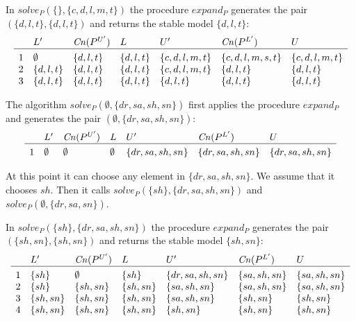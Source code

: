 \begin{Loesung}
{\begin{UList}
In $solve_P(\{\},\{c,d,l,m,t\})$ 
the procedure $expand_P$ generates the pair
$(\{d,l,t\},\{d,l,t\})$ 
and returns the stable model $\{d,l,t\}$:
\[
\begin{array}{c@{\hspace{10pt}}llllll}
& L' & \mathit{Cn}(P^{U'}) & L
& U' & \mathit{Cn}(P^{L'}) & U \\\hline\\[-3mm]
1 & \emptyset & \{d,l,t\} & \{d,l,t\} & \{c,d,l,m,t\} & \{c,d,l,m,s,t\} & \{c,d,l,m,t\} \\ 
2 & \{d,l,t\} & \{d,l,t\} & \{d,l,t\} & \{c,d,l,m,t\} & \{d,l,t\} & \{d,l,t\} \\ 
3 & \{d,l,t\} & \{d,l,t\} & \{d,l,t\} & \{d,l,t\} & \{d,l,t\} & \{d,l,t\} \\ 
\end{array}
\]

%
\item
The algorithm $solve_P(\emptyset, \{dr,sa,sh,sn\})$ 
first applies the procedure $expand_P$ and
generates the pair $(\emptyset, \{dr,sa,sh,sn\})$:
\[
\begin{array}{c@{\hspace{10pt}}llllll}
& L' & \mathit{Cn}(P^{U'}) & L
& U' & \mathit{Cn}(P^{L'}) & U \\\hline\\[-3mm]
1 & \emptyset & \emptyset & \emptyset & \{dr,sa,sh,sn\} & \{dr,sa,sh,sn\} & \{dr,sa,sh,sn\} \\ 
\end{array}
\]

At this point it can choose any element in $\{dr,sa,sh,sn\}$.
We assume that it chooses $sh$.
Then it calls $solve_P(\{sh\},\{dr,sa,sh,sn\})$ and $solve_P(\emptyset,\{dr,sa,sn\})$.

In $solve_P(\{sh\},\{dr,sa,sh,sn\})$ 
the procedure $expand_P$ generates the pair
\\
$(\{sh,sn\},\{sh,sn\})$ 
and returns the stable model $\{sh,sn\}$:
\[
\begin{array}{c@{\hspace{10pt}}llllll}
& L' & \mathit{Cn}(P^{U'}) & L
& U' & \mathit{Cn}(P^{L'}) & U \\\hline\\[-3mm]
1 & \{sh\} & \emptyset & \{sh\} & \{dr,sa,sh,sn\} & \{sa,sh,sn\} & \{sa,sh,sn\} \\ 
2 & \{sh\} & \{sh,sn\} & \{sh,sn\} & \{sa,sh,sn\} & \{sa,sh,sn\} & \{sa,sh,sn\} \\ 
3 & \{sh,sn\} & \{sh,sn\} & \{sh,sn\} & \{sa,sh,sn\} & \{sh,sn\} & \{sh,sn\} \\ 
4 & \{sh,sn\} & \{sh,sn\} & \{sh,sn\} & \{sh,sn\} & \{sh,sn\} & \{sh,sn\} \\ 
\end{array}
\]


\end{UList}}
\end{Loesung}
